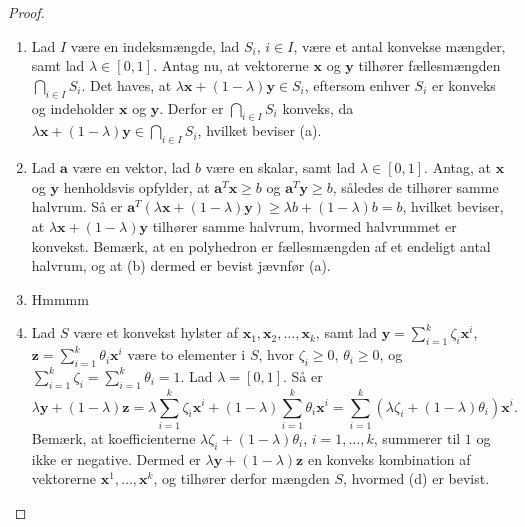 %
%
\begin{proof}
\begin{enumerate}[label=(\alph*)]
	\item Lad $I$ være en indeksmængde, lad $S_i$, $i \in I$, være et antal konvekse mængder, samt lad $ \lambda \in [0,1]$.
Antag nu, at vektorerne $\textbf{x}$ og $\textbf{y}$ tilhører fællesmængden $ \bigcap_{i \in I} S_i$. 
Det haves, at $ \lambda \textbf{x} + (1 - \lambda )\textbf{y} \in S_i$, eftersom enhver $S_i$ er konveks og  indeholder $\textbf{x}$ og $\textbf{y}$. Derfor er $ \bigcap_{i \in I} S_i$ konveks, da $ \lambda \textbf{x} + (1 - \lambda )\textbf{y} \in  \bigcap_{i \in I} S_i$, hvilket beviser (a). 
	\item Lad $\textbf{a}$ være en vektor, lad $b$ være en skalar, samt lad $ \lambda \in [0,1]$. 
Antag, at $\textbf{x}$ og $\textbf{y}$ henholdsvis opfylder, at $\textbf{a}^T \textbf{x} \geq b$ og $\textbf{a}^T \textbf{y} \geq b$, således de tilhører samme halvrum. 
Så er $\textbf{a}^T (\lambda \textbf{x} + (1 - \lambda) \textbf{y} ) \geq \lambda b + (1 - \lambda ) b = b$, hvilket beviser, at $ \lambda \textbf{x} + (1 - \lambda )\textbf{y}$ tilhører samme halvrum, hvormed halvrummet er konvekst.
Bemærk, at en polyhedron er fællesmængden af et endeligt antal halvrum, og at (b) dermed er bevist jævnfør (a). 
	\item Hmmmm
	\item Lad $S$ være et konvekst hylster af $\textbf{x}_1, \textbf{x}_2, \ldots, \textbf{x}_k$, samt lad $\textbf{y} = \sum_{i=1}^{k} \zeta_i \textbf{x}^i$, $\textbf{z} = \sum_{i=1}^{k} \theta_i \textbf{x}^i$ være to elementer i $S$, hvor $ \zeta_i \geq 0$, $ \theta_i \geq 0$, og $ \sum_{i=1}^{k} \zeta_i = \sum_{i=1}^{k} \theta_i = 1$. 
	Lad $ \lambda = [0,1]$. Så er $$\lambda \textbf{y} + (1 - \lambda ) \textbf{z} = \lambda \sum_{i=1}^k \zeta_i \textbf{x}^i + (1 - \lambda) \sum_{i=1}^k \theta_i \textbf{x}^i = \sum_{i=1}^k (\lambda \zeta_i + (1-\lambda )\theta_i ) \textbf{x}^i.$$
Bemærk, at koefficienterne $ \lambda \zeta_i + (1 - \lambda) \theta_i$, $i = 1, \ldots, k$, summerer til $1$ og ikke er negative. Dermed er $ \lambda \textbf{y} + (1 - \lambda ) \textbf{z}$ en konveks kombination af vektorerne $\textbf{x}^1, \ldots, \textbf{x}^k$, og tilhører derfor mængden $S$, hvormed (d) er bevist. 
\end{enumerate}
\end{proof}
